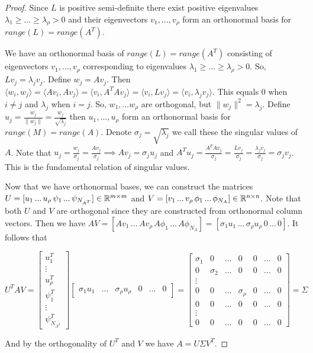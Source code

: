 \begin{proof}
\item Since $L$ is positive semi-definite there exist positive eigenvalues $\lambda_1 \geq ... \geq \lambda_\rho > 0$ and their eigenvectors $v_1, ..., v_\rho$ form an orthonormal basis for $\mathit{range}(L) = \mathit{range}(A^T)$.

\item We have an orthonormal basis of $\mathit{range}(L) = \mathit{range}(A^T)$ consisting of eigenvectors $v_1, ..., v_\rho$ corresponding to eigenvalues $\lambda_1 \geq ... \geq \lambda_\rho > 0$. So, $Lv_j = \lambda_j v_j$. Define $w_j = Av_j$. Then $\langle w_i, w_j \rangle = \langle Av_i, Av_j \rangle = \langle v_i, A^{T}Av_j \rangle = \langle v_i, Lv_j \rangle = \langle v_i, \lambda_j v_j \rangle$. This equals $0$ when $i \neq j$ and $\lambda_j$ when $i = j$. So, $w_1, ... w_\rho$ are orthogonal, but $\|w_j\|^2 = \lambda_j$. Define $u_j = \frac{w_j}{\|w_j\|} = \frac{w_j}{\sqrt{\lambda_j}}$ then $u_1, ..., u_\rho$ form an orthonormal basis for $\mathit{range}(M) = \mathit{range}(A)$. Denote $\sigma_j = \sqrt{\lambda_j}$ we call these the singular values of $A$. Note that $u_j = \frac{w_j}{\sigma_j} = \frac{Av_j}{\sigma_j} \implies Av_j = \sigma_j u_j$ and $A^T u_j = \frac{A^{T}Av_j}{\sigma_j} = \frac{Lv_j}{\sigma_j} = \frac{\lambda_j v_j}{\sigma_j} = \sigma_j v_j$. This is the fundamental relation of singular values.

\item Now that we have orthonormal bases, we can construct the matrices $U = [u_1\, ...\, u_\rho\, \psi_1\, ...\, \psi_{N_{A^T}}] \in \Bbb R^{m \times m} $ and $V = [v_1\, ...\, v_\rho\, \phi_1\, ...\, \phi_{N_A}] \in \Bbb R^{n \times n}$. Note that both $U$ and $V$ are orthogonal since they are constructed from orthonormal column vectors. Then we have $AV = [Av_1\, ...\, Av_\rho\, A\phi_1\, ...\, A\phi_{N_A}] = [\sigma_1 u_1 \, ... \, \sigma_\rho u_\rho \, 0 \, ... \, 0]$. It follows that

\begin{equation}
U^{T}AV = \begin{bmatrix}
		u_{1}^{T} \\
		\vdots \\
		u_{\rho}^{T} \\
		\psi_{1}^{T} \\
		\vdots \\
		\psi_{N_{A^T}}^{T}
	   \end{bmatrix}
\begin{bmatrix}
\sigma_1 u_1 & ... & \sigma_\rho u_\rho & 0 & ... & 0
\end{bmatrix} = 
\begin{bmatrix}
\sigma_1 & 0 & ... & 0 & 0 & ... & 0 \\
0 & \sigma_2 & ... & 0 & 0 & ... & 0 \\
\vdots \\
0 & 0 & ... & \sigma_\rho & 0 & ... & 0 \\
0 & 0 & ... & 0 & 0 & ... & 0 \\
\vdots \\
0 & 0 & ... & 0 & 0 & ... & 0
\end{bmatrix} = \Sigma
\end{equation}

And by the orthogonality of $U^T$ and $V$ we have $A = U \Sigma V^T$.

\end{proof}
